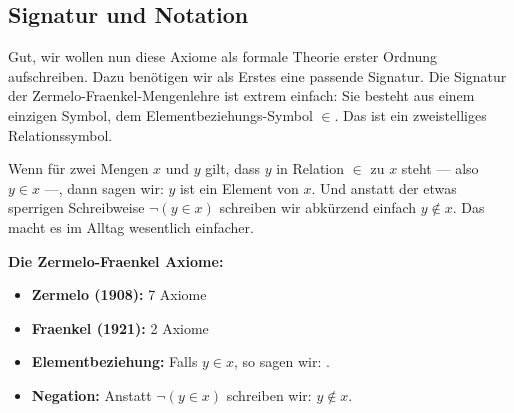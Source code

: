 \begin{ai-global-state-checkpoint-invisible-content}
\end{ai-global-state-checkpoint-invisible-content}

\subsection{Signatur und Notation}

\begin{spoken-clean}[01:15:50 - 01:18:40]
Gut, wir wollen nun diese Axiome als formale Theorie erster Ordnung aufschreiben. Dazu benötigen wir als Erstes eine passende Signatur. Die Signatur der Zermelo-Fraenkel-Mengenlehre ist extrem einfach: Sie besteht aus einem einzigen Symbol, dem Elementbeziehungs-Symbol $\in$. Das ist ein zweistelliges Relationssymbol.

Wenn für zwei Mengen $x$ und $y$ gilt, dass $y$ in Relation $\in$ zu $x$ steht --- also $y \in x$ ---, dann sagen wir: $y$ ist ein Element von $x$. Und anstatt der etwas sperrigen Schreibweise $\neg(y \in x)$ schreiben wir abkürzend einfach $y \notin x$. Das macht es im Alltag wesentlich einfacher.
\end{spoken-clean}

\begin{math-stroke}
\textbf{Die Zermelo-Fraenkel Axiome:}
\begin{itemize}
    \item \textbf{Zermelo (1908):} 7 Axiome
    \item \textbf{Fraenkel (1921):} 2 Axiome 
\end{itemize}


\begin{notation}
\begin{itemize}
    \item \textbf{Elementbeziehung:} Falls $y \in x$, so sagen wir: .
    \item \textbf{Negation:} Anstatt $\neg(y \in x)$ schreiben wir: $y \notin x$.
\end{itemize}
\end{notation}
\end{math-stroke}

